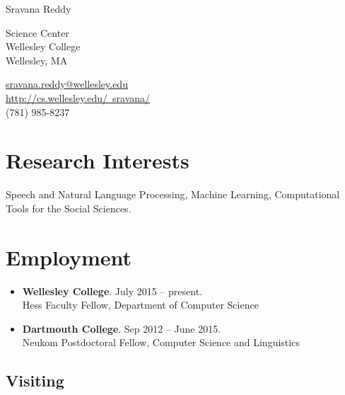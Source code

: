 \documentclass[10.5pt,letterpaper]{article}
\def\name{Sravana Reddy}
\begin{document}
\centerline{\Large\sc \name}


\bigskip

\begin{minipage}[t]{0.6\textwidth}
  Science Center\\
  Wellesley College \\
  Wellesley, MA 
 \end{minipage}
\begin{minipage}[t]{0.495\textwidth}
 \href{mailto:sravana.reddy@wellesley.edu}{sravana.reddy@wellesley.edu} \\
   \href{http://cs.wellesley.edu/~sravana/}{http://cs.wellesley.edu/~sravana/}\\ 
    (781) 985-8237
  
  
\end{minipage}

\section*{Research Interests}
Speech and Natural Language Processing, Machine Learning, Computational Tools for the Social Sciences.

\section*{Employment}

\begin{itemize}
\item {\bf Wellesley College}. July 2015 -- present. \\
Hess Faculty Fellow, Department of Computer Science

\item {\bf Dartmouth College}.  Sep 2012 -- June 2015.\\
Neukom Postdoctoral Fellow, Computer Science and Linguistics

\end{itemize}

\subsection*{Visiting}
\end{document}
